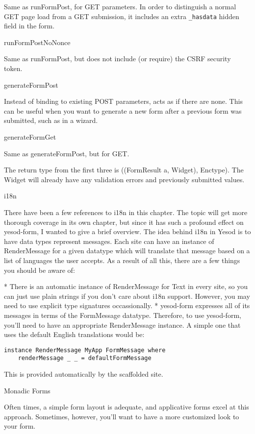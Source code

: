 Same as runFormPost, for GET parameters. In order to distinguish a normal GET page load from a GET submission, it includes an extra \lstinline'_hasdata' hidden field in the form.

runFormPostNoNonce

Same as runFormPost, but does not include (or require) the CSRF security token.

generateFormPost

Instead of binding to existing POST parameters, acts as if there are none. This can be useful when you want to generate a new form after a previous form was submitted, such as in a wizard.

generateFormGet

Same as generateFormPost, but for GET.

The return type from the first three is ((FormResult a, Widget), Enctype). The Widget will already have any validation errors and previously submitted values.

i18n

There have been a few references to i18n in this chapter. The topic will get more thorough coverage in its own chapter, but since it has such a profound effect on yesod-form, I wanted to give a brief overview. The idea behind i18n in Yesod is to have data types represent messages. Each site can have an instance of RenderMessage for a given datatype which will translate that message based on a list of languages the user accepts. As a result of all this, there are a few things you should be aware of:

* There is an automatic instance of RenderMessage for Text in every site, so you can just use plain strings if you don't care about i18n support. However, you may need to use explicit type signatures occassionally.
* yesod-form expresses all of its messages in terms of the FormMessage datatype. Therefore, to use yesod-form, you'll need to have an appropriate RenderMessage instance. A simple one that uses the default English translations would be:

\begin{lstlisting}
instance RenderMessage MyApp FormMessage where
    renderMessage _ _ = defaultFormMessage
\end{lstlisting}

This is provided automatically by the scaffolded site.

Monadic Forms

Often times, a simple form layout is adequate, and applicative forms excel at this approach. Sometimes, however, you'll want to have a more customized look to your form.

